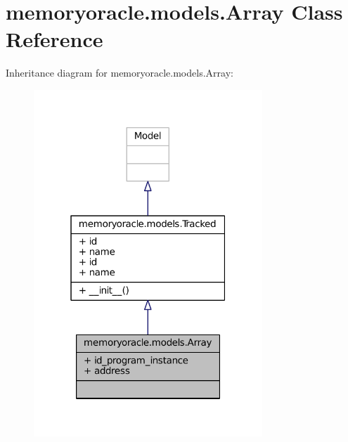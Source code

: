 \hypertarget{classmemoryoracle_1_1models_1_1Array}{}\section{memoryoracle.\+models.\+Array Class Reference}
\label{classmemoryoracle_1_1models_1_1Array}


Inheritance diagram for memoryoracle.\+models.\+Array\+:
\nopagebreak
\begin{figure}[H]
\begin{center}
\leavevmode
\includegraphics[width=244pt]{classmemoryoracle_1_1models_1_1Array__inherit__graph}
\end{center}
\end{figure}


